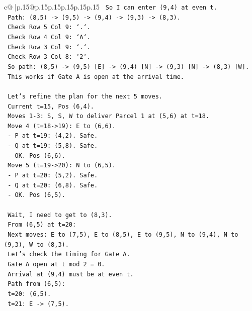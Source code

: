 \documentclass{article}
\begin{document}
{\begin{supertabular}{c@{$\;$}|p{.15\linewidth}@{}p{.15\linewidth}p{.15\linewidth}p{.15\linewidth}p{.15\linewidth}p{.15\linewidth}}
{{{\texttt{    So I can enter (9,4) at even t.} \\
\texttt{    Path: (8,5) {-}> (9,5) {-}> (9,4) {-}> (9,3) {-}> (8,3).} \\
\texttt{    Check Row 5 Col 9: `.`.} \\
\texttt{    Check Row 4 Col 9: `A`.} \\
\texttt{    Check Row 3 Col 9: `.`.} \\
\texttt{    Check Row 3 Col 8: `2`.} \\
\texttt{    So path: (8,5) {-}> (9,5) {[}E{]} {-}> (9,4) {[}N{]} {-}> (9,3) {[}N{]} {-}> (8,3) {[}W{]}.} \\
\texttt{    This works if Gate A is open at the arrival time.} \\
\\ 
\texttt{    Let's refine the plan for the next 5 moves.} \\
\texttt{    Current t=15, Pos (6,4).} \\
\texttt{    Moves 1{-}3: S, S, W to deliver Parcel 1 at (5,6) at t=18.} \\
\texttt{    Move 4 (t=18{-}>19): E to (6,6).} \\
\texttt{      {-} P at t=19: (4,2). Safe.} \\
\texttt{      {-} Q at t=19: (5,8). Safe.} \\
\texttt{      {-} OK. Pos (6,6).} \\
\texttt{    Move 5 (t=19{-}>20): N to (6,5).} \\
\texttt{      {-} P at t=20: (5,2). Safe.} \\
\texttt{      {-} Q at t=20: (6,8). Safe.} \\
\texttt{      {-} OK. Pos (6,5).} \\
\\ 
\texttt{    Wait, I need to get to (8,3).} \\
\texttt{    From (6,5) at t=20:} \\
\texttt{    Next moves: E to (7,5), E to (8,5), E to (9,5), N to (9,4), N to (9,3), W to (8,3).} \\
\texttt{    Let's check the timing for Gate A.} \\
\texttt{    Gate A open at t mod 2 = 0.} \\
\texttt{    Arrival at (9,4) must be at even t.} \\
\texttt{    Path from (6,5):} \\
\texttt{    t=20: (6,5).} \\
\texttt{    t=21: E {-}> (7,5).} \\
}}}
\end{supertabular}}
\end{document}
